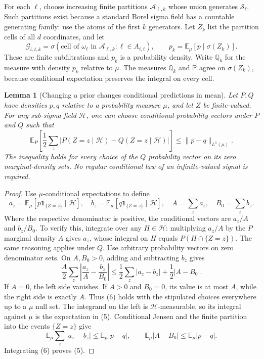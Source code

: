 \documentclass[11pt]{article}
\newtheorem{lemma}[theorem]{Lemma}
\theoremstyle{remark}\newtheorem{remark}[theorem]{Remark}
\newcommand{\E}{\mathbb E}
\newcommand{\Prb}{\mathbb P}
\begin{document}
For each $\ell$, choose increasing finite partitions
$\mathcal A_{\ell,k}$ whose union generates $\mathcal S_\ell$.
Such partitions exist because a standard Borel sigma field has a
countable generating family: use the atoms of the first $k$ generators.
Let $Z_k$ list the partition cells of all $d$ coordinates, and let
\[
 \mathcal G_{i,t,k}
    =\sigma(\text{cell of }\omega_\ell\text{ in }\mathcal A_{\ell,k}
                            :\ell\in A_{i,t}),\qquad
 p_k=\E_\mu[p\mid\sigma(Z_k)].
\]
These are finite subfiltrations and $p_k$ is a probability density.
Write $\mathbb Q_k$ for the measure with density $p_k$ relative to
$\mu$. The measures $\mathbb Q_k$ and $\Prb$ agree on $\sigma(Z_k)$,
because conditional expectation preserves the integral on every cell.

\begin{lemma}[Changing a prior changes conditional predictions in mean]
\label{lem:priorTV}
Let $P,Q$ have densities $p,q$ relative to a probability measure $\mu$,
and let $Z$ be finite-valued. For any sub-sigma field $\mathcal H$,
one can choose conditional-probability vectors under $P$ and $Q$ such
that
\[
 \E_P\left[\frac12\sum_z
   |P(Z=z\mid\mathcal H)-Q(Z=z\mid\mathcal H)|\right]
       \leq\|p-q\|_{L^1(\mu)}.                            \tag{5}
\]
The inequality holds for every choice of the $Q$ probability vector on
its zero marginal-density sets. No regular conditional law of an
infinite-valued signal is required.
\end{lemma}
\begin{proof}
Use $\mu$-conditional expectations to define
\[
 a_z=\E_\mu[p\mathbf1_{\{Z=z\}}\mid\mathcal H],\quad
 b_z=\E_\mu[q\mathbf1_{\{Z=z\}}\mid\mathcal H],\quad
 A=\sum_z a_z,\quad B_0=\sum_z b_z.
\]
Where the respective denominator is positive, the conditional vectors
are $a_z/A$ and $b_z/B_0$. To verify this, integrate over any
$H\in\mathcal H$: multiplying $a_z/A$ by the $P$ marginal density
$A$ gives $a_z$, whose integral on $H$ equals $P(H\cap\{Z=z\})$.
The same reasoning applies under $Q$. Use arbitrary probability vectors
on zero denominator sets.
On $A,B_0>0$, adding and subtracting $b_z$ gives
\[
 \frac A2\sum_z\left|\frac{a_z}A-\frac{b_z}{B_0}\right|
 \leq\frac12\sum_z|a_z-b_z|+\frac12|A-B_0|.              \tag{6}
\]
If $A=0$, the left side vanishes. If $A>0$ and $B_0=0$, its value
is at most $A$, while the right side is exactly $A$. Thus (6) holds
with the stipulated choices everywhere up to a $\mu$ null set.
The integrand on the left is $\mathcal H$-measurable, so its integral
against $\mu$ is the expectation in (5). Conditional Jensen and the
finite partition into the events $\{Z=z\}$ give
\[
 \E_\mu\sum_z|a_z-b_z|\leq\E_\mu|p-q|,\qquad
 \E_\mu|A-B_0|\leq\E_\mu|p-q|.
\]
Integrating (6) proves (5).
\end{proof}
\end{document}
